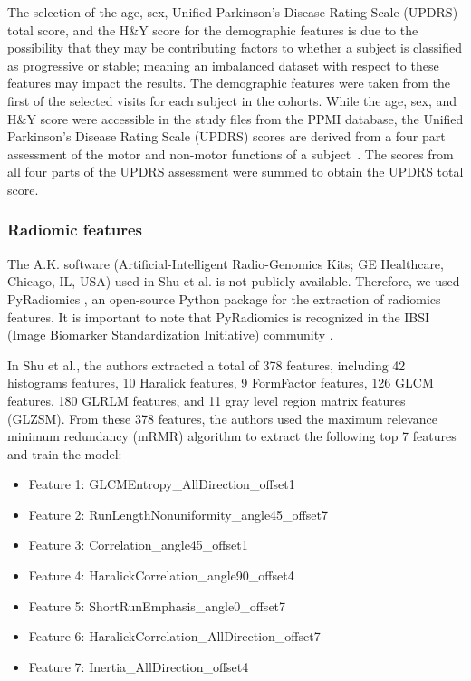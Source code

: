 The selection of the age, sex, Unified Parkinson's Disease Rating Scale (UPDRS) total score, and the H\&Y score 
for the demographic features is due to the possibility that they may be contributing factors to whether a subject 
is classified as progressive or stable; meaning an imbalanced dataset with respect to these features may impact the results.  
The demographic features were taken from the first of the selected visits for each subject in the cohorts. While the age, sex, 
and H\&Y score were accessible in the study files from the PPMI database, the Unified Parkinson's Disease Rating Scale (UPDRS) scores 
are derived from a four part assessment of the motor and non-motor functions of a subject~\cite{goetz_tilley_shaftman_stebbins_fahn_martinez-martin_poewe_sampaio_stern_dodel_et_al._2008}. 
The scores from all four parts of the UPDRS assessment were summed to obtain the UPDRS total score.

\subsubsection*{Radiomic features}
The A.K. software (Artificial-Intelligent Radio-Genomics Kits; GE Healthcare, Chicago, IL, USA) used in Shu et al. is not publicly available. Therefore, we used PyRadiomics \cite{pyradiomics_2017}, an open-source Python package for the extraction of radiomics features. It is important to note that PyRadiomics is recognized in the IBSI (Image Biomarker Standardization Initiative) community \cite{Zwanenburg_2020}.

In Shu et al., the authors extracted a total of 378 features, including 42 histograms features, 10 Haralick features, 9 FormFactor features, 126 GLCM features, 180 GLRLM features, and 11 gray level region matrix features (GLZSM). From these 378 features, the authors used the maximum relevance minimum redundancy (mRMR) algorithm to extract the following top 7 features and train the model:
\begin{itemize}
    \item Feature 1: GLCMEntropy\_AllDirection\_offset1
    \item Feature 2: RunLengthNonuniformity\_angle45\_offset7
    \item Feature 3: Correlation\_angle45\_offset1
    \item Feature 4: HaralickCorrelation\_angle90\_offset4
    \item Feature 5: ShortRunEmphasis\_angle0\_offset7
    \item Feature 6: HaralickCorrelation\_AllDirection\_offset7
    \item Feature 7: Inertia\_AllDirection\_offset4
\end{itemize}

